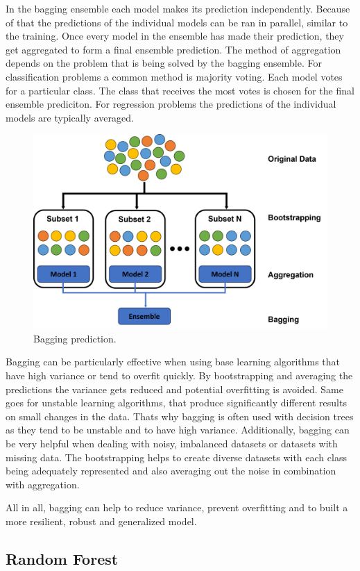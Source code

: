 In the bagging ensemble each model makes its prediction independently. Because of
that the predictions of the individual models can be ran in parallel, similar to
the training. Once every model in the ensemble has made their prediction, they get
aggregated to form a final ensemble prediction. The method of aggregation depends
on the problem that is being solved by the bagging ensemble. 
For classification problems a common method is majority voting. Each model votes 
for a particular class. The class that receives the most votes is chosen for the
final ensemble prediciton.
For regression problems the predictions of the individual models are typically 
averaged.

\begin{figure}[htbp]
    \centering
    \includegraphics[width=.5\textwidth]{figures/bagging_prediction}
    \caption{Bagging prediction.}
\end{figure}


Bagging can be particularly effective when using base learning algorithms
that have high variance or tend to overfit quickly. By bootstrapping and 
averaging the predictions the variance gets reduced and potential overfitting
is avoided.
Same goes for unstable learning algorithms, that produce significantly different
results on small changes in the data. Thats why bagging is often used with decision
trees as they tend to be unstable and to have high variance.
Additionally, bagging can be very helpful when dealing with noisy, imbalanced 
datasets or datasets with missing data. The bootstrapping helps to create 
diverse datasets with each class being adequately represented and also averaging
out the noise in combination with aggregation.


All in all, bagging can help to reduce variance, prevent overfitting and to built
a more resilient, robust and generalized model.

\subsection{Random Forest}

